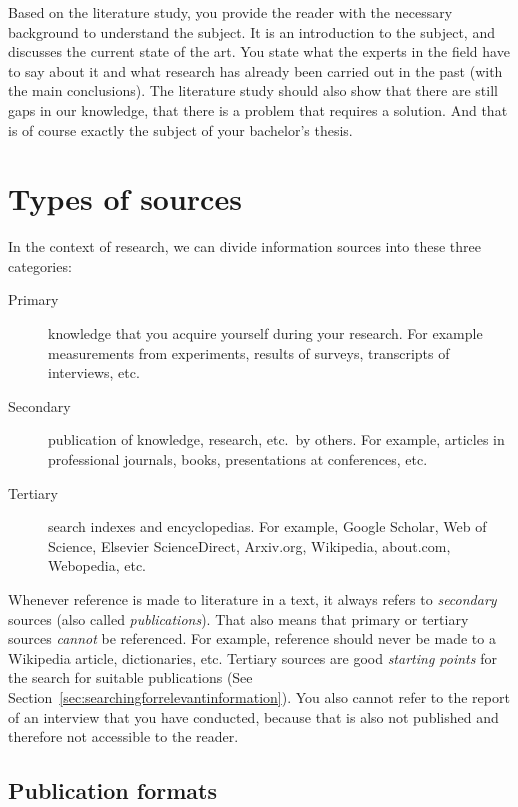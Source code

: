 Based on the literature study, you provide the reader with the necessary background to understand the subject. It is an introduction to the subject, and discusses the current state of the art. You state what the experts in the field have to say about it and what research has already been carried out in the past (with the main conclusions). The literature study should also show that there are still gaps in our knowledge, that there is a problem that requires a solution. And that is of course exactly the subject of your bachelor's thesis.

\section{Types of sources}
\label{sec:typessources}

In the context of research, we can divide information sources into these three categories:

\begin{description}
   \item[Primary] knowledge that you acquire yourself during your research. For example measurements from experiments, results of surveys, transcripts of interviews, etc.
   \item[Secondary] publication of knowledge, research, etc.~by others. For example, articles in professional journals, books, presentations at conferences, etc.
   \item[Tertiary] search indexes and encyclopedias. For example, Google Scholar, Web of Science, Elsevier ScienceDirect, Arxiv.org, Wikipedia, about.com, Webopedia, etc.
\end{description}

Whenever reference is made to literature in a text, it always refers to \emph{secondary} sources (also called \emph{publications}). That also means that primary or tertiary sources \emph{cannot} be referenced. For example, reference should never be made to a Wikipedia article, dictionaries, etc. Tertiary sources are good \textit{starting points} for the search for suitable publications (See Section~\ref{sec:searchingforrelevantinformation}). You also cannot refer to the report of an interview that you have conducted, because that is also not published and therefore not accessible to the reader.

\subsection{Publication formats}
\label{sub:publicationformats}

